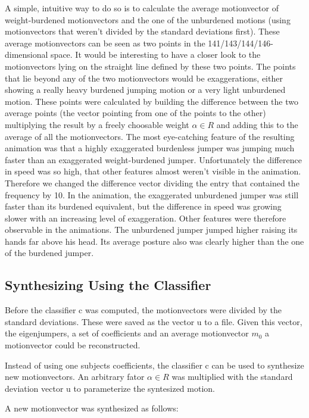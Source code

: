 \documentclass[a4paper]{article}
\begin{document}
A simple, intuitive way to do so is to calculate the average motionvector of weight-burdened motionvectors and the one of the unburdened motions (using motionvectors that weren't divided by the standard deviations first).
These average motionvectors can be seen as two points in the 141/143/144/146-dimensional space.
It would be interesting to have a closer look to the motionvectors lying on the straight line defined by these two points.
The points that lie beyond any of the two motionvectors would be exaggerations, either showing a really heavy burdened jumping motion or a very light unburdened motion.
These points were calculated by building the difference between the two average points (the vector pointing from one of the points to the other) multiplying the result by a freely choosable weight $\alpha \in R$ and adding this to the average of all the motionvectors.
The most eye-catching feature of the resulting animation was that a highly exaggerated burdenless jumper was jumping much faster than an exaggerated weight-burdened jumper.
Unfortunately the difference in speed was so high, that other features almost weren't visible in the animation.
Therefore we changed the difference vector dividing the entry that contained the frequency by 10.
In the animation, the exaggerated unburdened jumper was still faster than its burdened equivalent, but the difference in speed was growing slower with an increasing level of exaggeration.
Other features were therefore observable in the animations.
The unburdened jumper jumped higher raising its hands far above his head.
Its average posture also was clearly higher than the one of the burdened jumper.

\subsection{Synthesizing Using the Classifier}

Before the classifier c was computed, the motionvectors were divided by the standard deviations. These were saved as the vector u to a file.
Given this vector, the eigenjumpers, a set of coefficients and an average motionvector $m_0$ a motionvector could be reconstructed.

Instead of using one subjects coefficients, the classifier c can be used to synthesize new motionvectors.
An arbitrary fator $\alpha \in R$ was multiplied with the standard deviation vector u to parameterize the syntesized motion.

A new motionvector was synthesized as follows:
\end{document}
